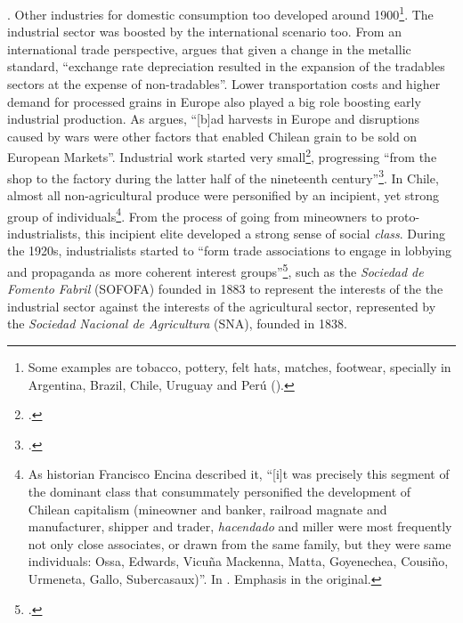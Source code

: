 \documentclass[onesided]{article}\usepackage[]{graphicx}\usepackage[]{color}
\begin{document}
{	}.  Other industries for domestic consumption too developed around 1900\footnote{
	Some examples are tobacco, pottery, felt hats, matches, footwear, specially in Argentina, Brazil, Chile, Uruguay and Per\'u (\citet[p. 235]{Rippy:1971rz}).
	}. The industrial sector was boosted by the international scenario too. From an international trade perspective, \citet[p. 5]{Haber2005} argues that given a change in the  metallic standard, ``exchange rate depreciation resulted in the expansion of the tradables sectors at the expense of non-tradables''. Lower transportation costs and higher demand for processed grains in Europe also played a big role boosting early  industrial production. As \citet[p. 68]{Bauer:2008kx} argues, ``[b]ad harvests in Europe and disruptions caused by wars were other factors that enabled Chilean grain to be sold on European Markets''. Industrial work started very small\footnote{\citet[p. 68]{Marichal:1989bh}.}, progressing ``from the shop to the factory during the latter half of the nineteenth century''\footnote{\citet[p. 235]{Rippy:1971rz}.}. In Chile, almost all non-agricultural produce were personified by an incipient, yet strong group of individuals\footnote{As historian Francisco Encina described it, ``[i]t was precisely this segment of the dominant class that consummately personified the development of Chilean capitalism (mineowner and banker, railroad magnate and manufacturer, shipper and trader, \emph{hacendado} and miller were most frequently not only close associates, or drawn from the same family, but they were same individuals: Ossa, Edwards, Vicu\~{n}a Mackenna, Matta, Goyenechea, Cousi\~{n}o, Urmeneta, Gallo, Subercasaux)''. In \citet[p. 30]{Zeitlin:1984aa}. Emphasis in the original.}. From the process of going from mineowners to proto-industrialists, this incipient elite developed a strong sense of social \emph{class}. During the 1920s, industrialists started to ``form trade associations to engage in lobbying and propaganda as more coherent interest groups''\footnote{\citet[p. 107]{Weaver:1980vn}.}, such as the \emph{Sociedad de Fomento Fabril} (SOFOFA) founded in 1883 to represent the interests of the the industrial sector against the interests of the agricultural sector, represented by the \emph{Sociedad Nacional de Agricultura} (SNA), founded in 1838. 
\end{document}
